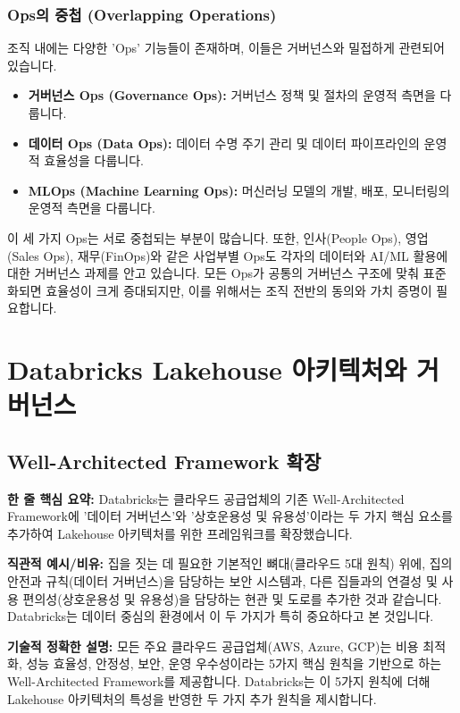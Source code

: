 \documentclass[11pt,a4paper]{article}
\begin{document}
\subsubsection*{Ops의 중첩 (Overlapping Operations)}
조직 내에는 다양한 'Ops' 기능들이 존재하며, 이들은 거버넌스와 밀접하게 관련되어 있습니다.
\begin{itemize}
    \item \textbf{거버넌스 Ops (Governance Ops):} 거버넌스 정책 및 절차의 운영적 측면을 다룹니다.
    \item \textbf{데이터 Ops (Data Ops):} 데이터 수명 주기 관리 및 데이터 파이프라인의 운영적 효율성을 다룹니다.
    \item \textbf{MLOps (Machine Learning Ops):} 머신러닝 모델의 개발, 배포, 모니터링의 운영적 측면을 다룹니다.
\end{itemize}
이 세 가지 Ops는 서로 중첩되는 부분이 많습니다. 또한, 인사(People Ops), 영업(Sales Ops), 재무(FinOps)와 같은 사업부별 Ops도 각자의 데이터와 AI/ML 활용에 대한 거버넌스 과제를 안고 있습니다. 모든 Ops가 공통의 거버넌스 구조에 맞춰 표준화되면 효율성이 크게 증대되지만, 이를 위해서는 조직 전반의 동의와 가치 증명이 필요합니다.

\newpage
\section*{Databricks Lakehouse 아키텍처와 거버넌스}

\subsection*{Well-Architected Framework 확장}

\begin{keyconceptbox}
\textbf{한 줄 핵심 요약:} Databricks는 클라우드 공급업체의 기존 Well-Architected Framework에 '데이터 거버넌스'와 '상호운용성 및 유용성'이라는 두 가지 핵심 요소를 추가하여 Lakehouse 아키텍처를 위한 프레임워크를 확장했습니다.
\end{keyconceptbox}

\textbf{직관적 예시/비유:}
집을 짓는 데 필요한 기본적인 뼈대(클라우드 5대 원칙) 위에, 집의 안전과 규칙(데이터 거버넌스)을 담당하는 보안 시스템과, 다른 집들과의 연결성 및 사용 편의성(상호운용성 및 유용성)을 담당하는 현관 및 도로를 추가한 것과 같습니다. Databricks는 데이터 중심의 환경에서 이 두 가지가 특히 중요하다고 본 것입니다.

\textbf{기술적 정확한 설명:}
모든 주요 클라우드 공급업체(AWS, Azure, GCP)는 비용 최적화, 성능 효율성, 안정성, 보안, 운영 우수성이라는 5가지 핵심 원칙을 기반으로 하는 Well-Architected Framework를 제공합니다. Databricks는 이 5가지 원칙에 더해 Lakehouse 아키텍처의 특성을 반영한 두 가지 추가 원칙을 제시합니다.
\end{document}
